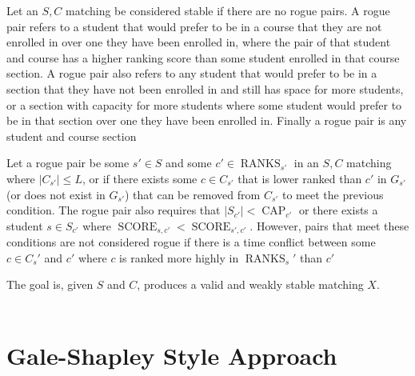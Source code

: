 \documentclass{article}
\newcommand{\caps}{\operatorname{CAP}}
\newcommand{\ranks}{\operatorname{RANKS}}
\newcommand{\score}{\operatorname{SCORE}}
\begin{document}
Let an $S, C$ matching be considered stable if there are no rogue pairs. A rogue pair refers to a student that would prefer to be in a course that they are not enrolled in over one they have been enrolled in, where the pair of that student and course has a higher ranking score than some student enrolled in that course section. A rogue pair also refers to any student that would prefer to be in a section that they have not been enrolled in and still has space for more students, or a section with capacity for more students where some student would prefer to be in that section over one they have been enrolled in. Finally a rogue pair is any student and course section\\\par
Let a rogue pair be some $s' \in S$ and some $c' \in \ranks_{s'}$ in an $S, C$ matching where $|C_{s'}| \le L$, or if there exists some $c \in C_{s'}$ that is lower ranked than $c'$ in $G_{s'}$ (or does not exist in $G_{s'}$) that can be removed from $C_{s'}$ to meet the previous condition. The rogue pair also requires that $|S_{c'}| < \caps_{c'}$ or there exists a student $s \in S_{c'}$ where $\score_{s, c'} < \score_{s', c'}$. However, pairs that meet these conditions are not considered rogue if there is a time conflict between some $c \in C_s'$ and $c'$ where $c$ is ranked more highly in $\ranks_s'$ than $c'$\\\par

The goal is, given $S$ and $C$, produces a valid and weakly stable matching $X$.
\\\\

\section{Gale-Shapley Style Approach}
\end{document}
